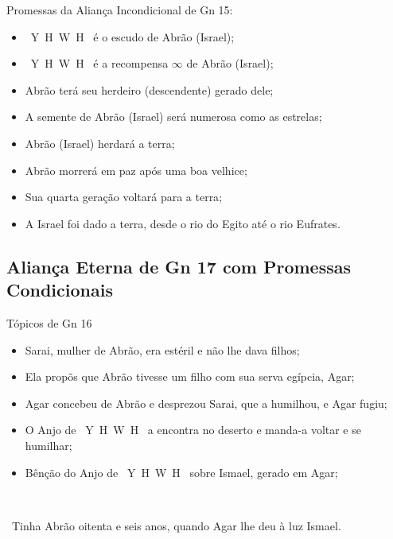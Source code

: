 \documentclass[12pt,aspectratio=169]{beamer}
\newcommand{\YA}{%
    \mbox{%
        Y\makebox[0pt][l]{\hspace{-0.178em}\raisebox{-0.00ex}{\scalebox{0.30}{E}}}%
        H\makebox[0pt][l]{\hspace{-0.010em}\raisebox{-0.00ex}{\scalebox{0.30}{O}}}%
        W\makebox[0pt][l]{\hspace{-0.245em}\raisebox{-0.00ex}{\scalebox{0.30}{A}}}%
        H%
    }%
}
\newcommand{\ver}[1]{%
    \raisebox{0.50ex}{%
        \scalebox{1.1}{%
            \pmb{\textbf{\textcolor{BSpbg}{#1}}}%
        }%
    }%
}
\newcommand{\QUOTE}[1]{%
    \par\noindent\hspace*{0.05\linewidth}%
    \begin{minipage}{0.9\linewidth}%
        \linespread{1.35}\large{#1}%
    \end{minipage}%
}
\newcommand{\YEL}[1]{{\textcolor{TXyel}{#1}}}
\newcommand{\CYA}[1]{{\textcolor{TXcya}{#1}}}
\newcommand{\BRI}[1]{{\textcolor{BSpbg}{#1}}}   %
\begin{document}
    \begin{frame}{Promessas da \YEL{Aliança Incondicional} de \BRI{Gn 15}:}
        \begin{itemize}
            \item<1-> \BRI{\YA} é o \YEL{escudo} de Abrão (Israel);
            \item<2-> \BRI{\YA} é a \YEL{recompensa} $\infty$ de Abrão (Israel);
            \item<3-> Abrão terá seu herdeiro (descendente) \YEL{gerado dele};
            \item<4-> A semente de Abrão (Israel) será \YEL{numerosa} como as \CYA{estrelas};
            \item<5-> Abrão (Israel) \YEL{herdará} a \YEL{terra};
            \item<6-> Abrão morrerá em \YEL{paz} após uma \YEL{boa velhice};
            \item<7-> Sua quarta geração \YEL{voltará} para a \YEL{terra};
            \item<8-> \YEL{A Israel foi dado a terra, desde o rio do Egito até o rio Eufrates}.
        \end{itemize}
    \end{frame}

    \subsection{\BRI{Aliança Eterna} de Gn 17 com Promessas Condicionais}

    \begin{frame}{\YEL{Tópicos de Gn 16}}
        \begin{itemize}
            \item Sarai, mulher de Abrão, era estéril e não lhe dava filhos;
            \item Ela propõs que Abrão tivesse um filho com sua serva egípcia, Agar;
            \item Agar concebeu de Abrão e desprezou Sarai, que a humilhou, e Agar fugiu;
            \item O \BRI{Anjo de \YA} a encontra no deserto e manda-a voltar e se humilhar;
            \item Bênção do \BRI{Anjo de \YA} sobre Ismael, gerado em Agar;
        \end{itemize}\\[1.5\bigskipamount]
        \QUOTE{
            \ver{16}~Tinha Abrão \YEL{oitenta e seis anos}, quando Agar lhe deu à luz Ismael.
        }
    \end{frame}
\end{document}
